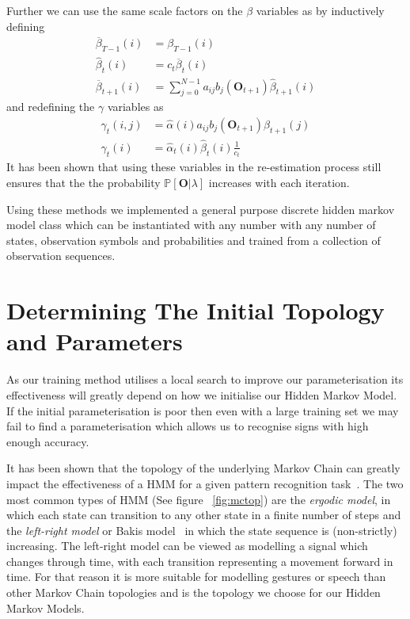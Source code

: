 Further we can use the same scale factors on the $\beta$ variables as by inductively defining
\begin{align*}
\overline{\beta}_{T-1}(i) &= \beta_{T-1}(i) \\
\hat{\beta}_{t}(i) &= c_t\overline{\beta}_t(i)\\
\overline{\beta}_{t+1}(i) &= \sum_{j=0}^{N-1}a_{ij}b_j(\mathbf{O}_{t+1})\hat{\beta}_{t+1}(i)
\end{align*}
and redefining the $\gamma$ variables as
\begin{align*}
\gamma_t(i,j)&=\hat{\alpha}(i)a_{ij}b_j(\mathbf{O}_{t+1})\beta_{t+1}(j)\\
\gamma_t(i) &= \hat{\alpha}_t(i)\hat{\beta}_t(i)\frac{1}{c_t}
\end{align*}
It has been shown that using these variables in the re-estimation process still ensures that the the probability $\mathbb{P}[\mathbf{O}|\lambda]$ increases with each iteration. 

Using these methods we implemented a general purpose discrete hidden markov model class which can be instantiated with any number with any number of states, observation symbols and probabilities and trained from a collection of observation sequences.

\section{Determining The Initial Topology and Parameters}
As our training method utilises a local search to improve our parameterisation its effectiveness will greatly depend on how we initialise our Hidden Markov Model. If the initial parameterisation is poor then even with a large training set we may fail to find a parameterisation which allows us to  recognise signs with high enough accuracy.

It has been shown that the topology of the underlying Markov Chain can greatly impact the effectiveness of a HMM for a given pattern recognition task~\citep{rabiner1989tutorial, jelinek1998statistical}. The two most common types of HMM (See figure ~\ref{fig:mctop}) are the \emph{ergodic model}, in which each state can transition to any other state in a finite number of steps and the \emph{left-right model} or Bakis model~\citep{bakis1976continuous} in which the state sequence is (non-strictly) increasing. The left-right model can be viewed as modelling a signal which changes through time, with each transition representing a movement forward in time. For that reason it is more suitable for modelling gestures or speech than other Markov Chain topologies and is the topology we choose for our Hidden Markov Models.

